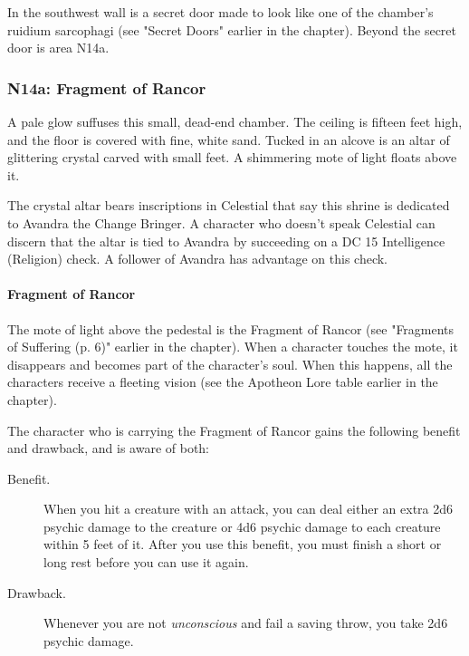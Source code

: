\documentclass[letterpaper, 11pt, bg=full, twocolumn]{dndbook}
\begin{document}
In the southwest wall is a secret door made to look like one of the chamber's ruidium sarcophagi (see "Secret Doors" earlier in the chapter). Beyond the secret door is area N14a.

\subsubsection{N14a: Fragment of Rancor}

\begin{DndReadAloud}
A pale glow suffuses this small, dead-end chamber. The ceiling is fifteen feet high, and the floor is covered with fine, white sand. Tucked in an alcove is an altar of glittering crystal carved with small feet. A shimmering mote of light floats above it.
\end{DndReadAloud}

The crystal altar bears inscriptions in Celestial that say this shrine is dedicated to Avandra the Change Bringer. A character who doesn't speak Celestial can discern that the altar is tied to Avandra by succeeding on a DC 15 Intelligence (Religion) check. A follower of Avandra has advantage on this check.

\paragraph{Fragment of Rancor}

The mote of light above the pedestal is the Fragment of Rancor (see "Fragments of Suffering (p. 6)" earlier in the chapter). When a character touches the mote, it disappears and becomes part of the character's soul. When this happens, all the characters receive a fleeting vision (see the Apotheon Lore table earlier in the chapter).

The character who is carrying the Fragment of Rancor gains the following benefit and drawback, and is aware of both:

\begin{DndSidebar}{}
\begin{description}
\item[Benefit.] When you hit a creature with an attack, you can deal either an extra 2d6 psychic damage to the creature or 4d6 psychic damage to each creature within 5 feet of it. After you use this benefit, you must finish a short or long rest before you can use it again.
\item[Drawback.] Whenever you are not \textit{unconscious} and fail a saving throw, you take 2d6 psychic damage.
\end{description}
\end{DndSidebar}
\end{document}
